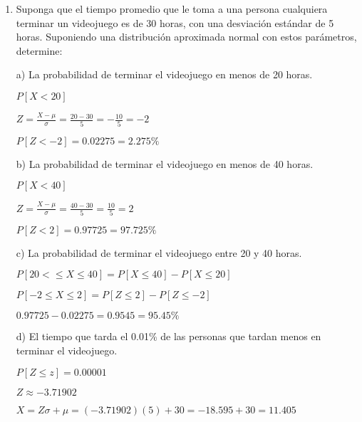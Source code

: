 \documentclass[a4paper, 12pt]{article}
\newcommand{\Aspace}{0.2cm}
\begin{document}
    \begin{enumerate}
        \item Suponga que el tiempo promedio que le toma a una persona cualquiera terminar un videojuego es de 30 horas, con una desviación estándar de 5 horas. Suponiendo una distribución aproximada normal con estos parámetros, determine: \par
            \vspace{\Aspace} \par
            a) La probabilidad de terminar el videojuego en menos de 20 horas.
            \\ { \color{azul} 
                $ P[X < 20] $ \par
                $ Z = \frac{X - \mu}{\sigma} = \frac{20 - 30}{5} = -\frac{10}{5} = -2 $ \par
                $ P[Z < -2] = 0{.}02275 = 2{.}275\% $
            }

            \vspace{\Aspace} \par
            b) La probabilidad de terminar el videojuego en menos de 40 horas.
            \\ { \color{azul} 
                $ P[X < 40] $ \par
                $ Z = \frac{X - \mu}{\sigma} = \frac{40 - 30}{5} = \frac{10}{5} = 2 $ \par
                $ P[Z < 2] = 0{.}97725 = 97{.}725\% $               
            }

            \vspace{\Aspace} \par
            c) La probabilidad de terminar el videojuego entre 20 y 40 horas.
            \\ { \color{azul} 
                $ P[20 < \leq X \leq 40] = P[X \leq 40] - P[X \leq 20] $ \par
                $ P[-2 \leq X \leq 2] = P[Z \leq 2] - P[Z \leq -2] $ \par
                $ 0{.}97725 - 0{.}02275 = 0{.}9545 = 95{.}45\% $
            }

            \vspace{\Aspace} \par
            d) El tiempo que tarda el 0.01\% de las personas que tardan menos en terminar el videojuego.
            \\ { \color{azul} 
                $ P[Z \leq z] = 0.00001 $ \par
                $ Z \approx -3{.}71902 $ \par
                $ X = Z\sigma + \mu = (-3{.}71902)(5) + 30 = -18{.}595 + 30 = 11{.}405 $
            }
    \end{enumerate}
\end{document}
